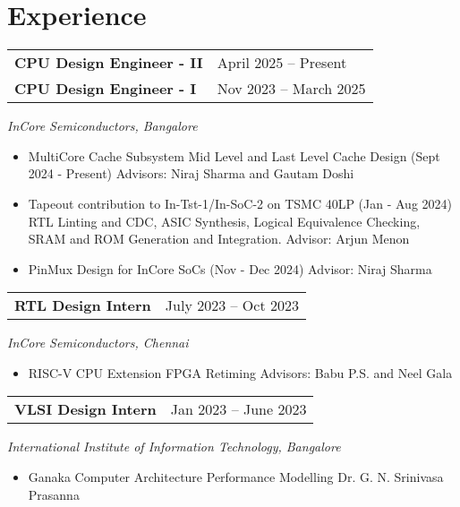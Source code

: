 \section{\sc Experience}


\begin{tabular}{@{}p{4in}p{2in}}
    {\bf{CPU Design Engineer - II}}  & April 2025 – Present \\
    {\bf{CPU Design Engineer - I}}  & Nov 2023 – March 2025 \\
  \end{tabular}  
  \textit{InCore Semiconductors, Bangalore} 
  \begin{itemize}
    \setlength\itemsep{0em}
    \item MultiCore Cache Subsystem 
      \subitem Mid Level and Last Level Cache Design (Sept 2024 - Present)
      \subitem Advisors: Niraj Sharma and Gautam Doshi     
    \item Tapeout contribution to In-Tst-1/In-SoC-2 on TSMC 40LP (Jan - Aug 2024)
      \subitem RTL Linting and CDC, ASIC Synthesis, Logical Equivalence Checking, 
      \subitem SRAM and ROM Generation and Integration.
      \subitem Advisor: Arjun Menon
    \item PinMux Design for InCore SoCs (Nov - Dec 2024)
      \subitem Advisor: Niraj Sharma       
\end{itemize}

\begin{tabular}{@{}p{4in}p{2in}}
  {\bf{RTL Design Intern}}  & July 2023 – Oct 2023 \\
\end{tabular}  
\textit{InCore Semiconductors, Chennai} 
\begin{itemize}
    \setlength\itemsep{0em}
  \item RISC-V CPU Extension FPGA Retiming
    \subitem Advisors: Babu P.S. and Neel Gala  
\end{itemize}

\begin{tabular}{@{}p{4in}p{2in}}
  {\bf{VLSI Design Intern}} & Jan 2023 – June 2023 \\
\end{tabular}
\textit{International Institute of Information Technology, Bangalore}  
\begin{itemize}
    \setlength\itemsep{0em}
  \item Ganaka Computer Architecture Performance Modelling 
    \subitem Dr. G. N. Srinivasa Prasanna 
\end{itemize}

